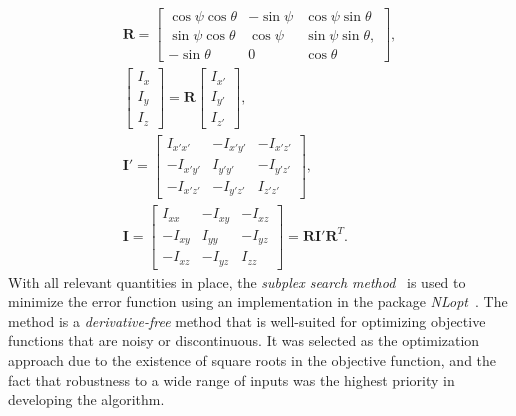 \begin{gather}
\bm{R} = \left[\begin{array} {ccc} {\cos\psi\cos\theta} & {-\sin\psi} & {\cos\psi\sin\theta}\\ {\sin\psi\cos\theta} & {\cos\psi} & {\sin\psi\sin\theta}, \\
{-\sin\theta} & {0} & {\cos\theta}\end{array} \right], \\
\left[\begin{array} {ccc} {I_x} \\ {I_y} \\ {I_z} \end{array} \right] = \bm{R} \left[\begin{array} {ccc} {I_{x'}} \\ {I_{y'}} \\ {I_{z'}} \end{array} \right], \\
\bm{I}' = \left[\begin{array} {ccc} {I_{x'x'}} & {-I_{x'y'}} & {-I_{x'z'}}\\ {-I_{x'y'}} & {I_{y'y'}} & {-I_{y'z'}} \\ -{I_{x'z'}} & {-I_{y'z'}} & {I_{z'z'}} \end{array} \right], \\
\bm{I} = \left[\begin{array} {ccc} {I_{xx}} & {-I_{xy}} & {-I_{xz}}\\ {-I_{xy}} & {I_{yy}} & {-I_{yz}} \\ -{I_{xz}} & {-I_{yz}} & {I_{zz}} \end{array} \right] = \bm{R}\bm{I}'\mathbf{R}^T.
\end{gather}
\noindent With all relevant quantities in place, the \textit{subplex search method}~\cite{rowan} is used to minimize the error function using an implementation in the package \textit{NLopt}~\cite{nlo}. The method is a \textit{derivative-free} method that is well-suited for optimizing objective functions that are noisy or discontinuous. It was selected as the optimization approach due to the existence of square roots in the objective function, and the fact that robustness to a wide range of inputs was the highest priority in developing the algorithm. \\ \\
%
